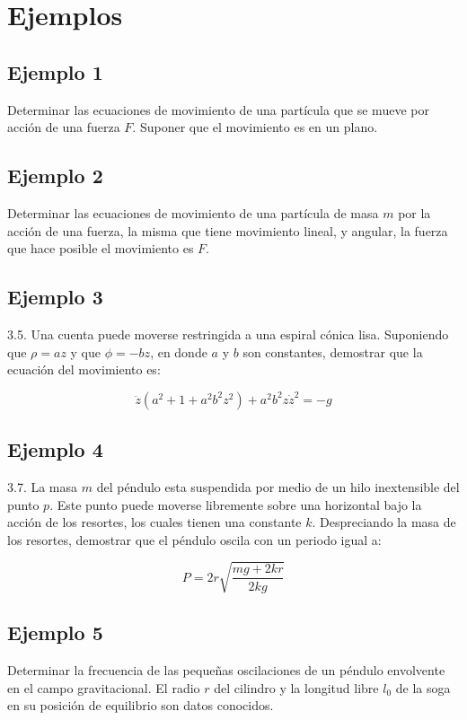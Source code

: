 \section{Ejemplos}

\subsection{Ejemplo 1}
Determinar las ecuaciones de movimiento de una partícula que se mueve por acción
de una fuerza $F$. Suponer que el movimiento es en un plano.

\subsection{Ejemplo 2}
Determinar las ecuaciones de movimiento de una partícula de masa $m$ por la
acción de una fuerza, la misma que tiene movimiento lineal, y angular, la fuerza
que hace posible el movimiento es $F$.

\subsection{Ejemplo 3}
3.5. Una cuenta puede moverse restringida a una espiral cónica lisa. Suponiendo
que $\rho=az$ y que $\phi=-bz$, en donde $a$ y $b$ son constantes, demostrar que
la ecuación del movimiento es:

\begin{equation*}
    \ddot{z}(a^2+1+a^2b^2z^2)+a^2b^2z\dot{z}^2=-g
\end{equation*}

\subsection{Ejemplo 4}
3.7. La masa $m$ del péndulo esta suspendida por medio de un hilo inextensible
del punto $p$. Este punto puede moverse libremente sobre una horizontal bajo la
acción de los resortes, los cuales tienen una constante $k$. Despreciando la
masa de los resortes, demostrar que el péndulo oscila con un periodo igual a:

\begin{equation*}
    P=2r\sqrt{\frac{mg+2kr}{2kg}}
\end{equation*}

\subsection{Ejemplo 5}
Determinar la frecuencia de las pequeñas oscilaciones de un péndulo envolvente
en el campo gravitacional. El radio $r$ del cilindro y la longitud libre $l_0$
de la soga en su posición de equilibrio son datos conocidos.

